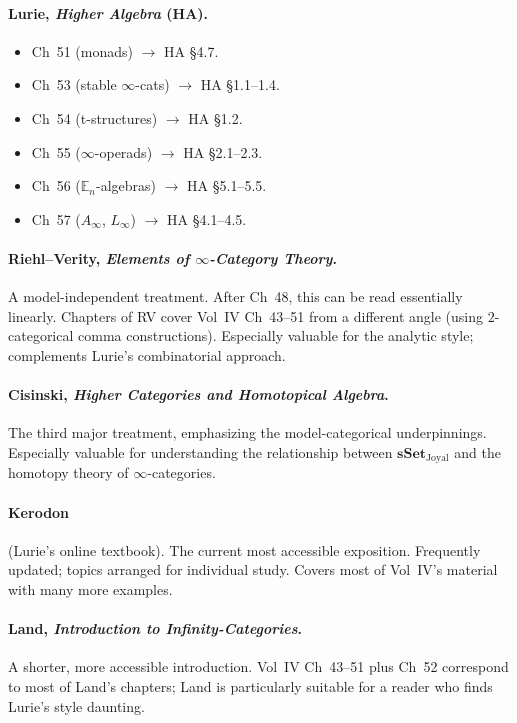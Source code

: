 \paragraph{Lurie, \emph{Higher Algebra} (HA).}
\begin{itemize}
  \item Ch~51 (monads) $\to$ HA §4.7.
  \item Ch~53 (stable $\infty$-cats) $\to$ HA §1.1--1.4.
  \item Ch~54 (t-structures) $\to$ HA §1.2.
  \item Ch~55 ($\infty$-operads) $\to$ HA §2.1--2.3.
  \item Ch~56 ($\mathbb{E}_n$-algebras) $\to$ HA §5.1--5.5.
  \item Ch~57 ($A_\infty$, $L_\infty$) $\to$ HA §4.1--4.5.
\end{itemize}

\paragraph{Riehl–Verity, \emph{Elements of $\infty$-Category Theory}.}
A model-independent treatment. After Ch~48, this can be read essentially
linearly. Chapters of RV cover Vol~IV Ch~43--51 from a different angle
(using $2$-categorical comma constructions). Especially valuable for the
analytic style; complements Lurie's combinatorial approach.

\paragraph{Cisinski, \emph{Higher Categories and Homotopical Algebra}.}
The third major treatment, emphasizing the model-categorical
underpinnings. Especially valuable for understanding the relationship
between $\mathbf{sSet}_{\mathrm{Joyal}}$ and the homotopy theory of
$\infty$-categories.

\paragraph{Kerodon} (Lurie's online textbook).
The current most accessible exposition. Frequently updated; topics
arranged for individual study. Covers most of Vol~IV's material with
many more examples.

\paragraph{Land, \emph{Introduction to Infinity-Categories}.}
A shorter, more accessible introduction. Vol~IV Ch~43--51 plus Ch~52
correspond to most of Land's chapters; Land is particularly suitable for
a reader who finds Lurie's style daunting.

